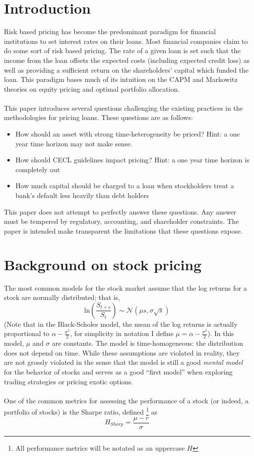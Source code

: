 \documentclass{article}
\begin{document}


\section{Introduction}
Risk based pricing has become the predominant paradigm for financial institutions to set interest rates on their loans.  Most financial companies claim to do some sort of risk based pricing.  The rate of a given loan is set such that the income from the loan offsets the expected costs (including expected credit loss) as well as providing a sufficient return on the shareholders' capital which funded the loan.  This paradigm bases much of its intuition on the CAPM and Markowitz theories on equity pricing and optimal portfolio allocation.  
\\
\\
This paper introduces several questions challenging the existing practices in the methodologies for pricing loans.  These questions are as follows:
\begin{itemize}
\item How should an asset with strong time-heterogeneity be priced?  Hint: a one year time horizon may not make sense.
\item How should CECL guidelines impact pricing? Hint: a one year time horizon is completely out
\item How much capital should be charged to a loan when stockholders treat a bank's default less heavily than debt holders
\end{itemize}

This paper does not attempt to perfectly answer these questions.  Any answer must be tempered by regulatory, accounting, and shareholder constraints.  The paper is intended make transparent the limitations that these questions expose.  

\section{Background on stock pricing}

The most common models for the stock market assume that the log returns for a stock are normally distributed; that is,
\[\mathrm{ln}\left(\frac{S_{t+s}}{S_t}\right) \sim \mathcal{N}(\mu s, \sigma \sqrt{s})\]
(Note that in the Black-Scholes model, the mean of the log returns is actually proportional to \(\alpha-\frac{\sigma^2}{2}\), for simplicity in notation I define \(\mu=\alpha-\frac{\sigma^2}{2}\)).  In this model, \(\mu\) and \(\sigma\) are constants.  The model is time-homogeneous: the distribution does not depend on time.  While these assumptions are violated in reality, they are not grossly violated in the sense that the model is still a good \emph{mental model} for the behavior of stocks and serves as a good ``first model'' when exploring trading strategies or pricing exotic options.  
\\
\\
One of the common metrics for assessing the performance of a stock (or indeed, a portfolio of stocks) is the Sharpe ratio, defined \footnote{All performance metrics will be notated as an uppercase \(H\)} as 
\[H_{Sharp}=\frac{\mu-r}{\sigma}\]
\end{document}
